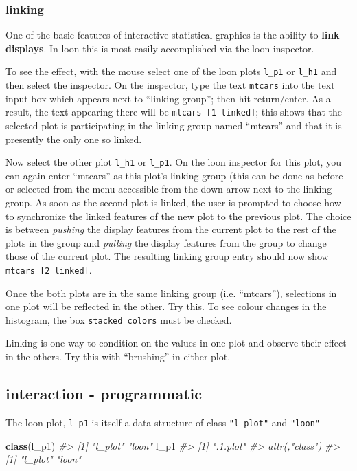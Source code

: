 \documentclass[]{article}
\newenvironment{Shaded}{\begin{snugshade}}{\end{snugshade}}
\newcommand{\KeywordTok}[1]{\textcolor[rgb]{0.13,0.29,0.53}{\textbf{#1}}}
\newcommand{\CommentTok}[1]{\textcolor[rgb]{0.56,0.35,0.01}{\textit{#1}}}
\newcommand{\NormalTok}[1]{#1}
\begin{document}
\subsubsection{linking}\label{linking}

One of the basic features of interactive statistical graphics is the
ability to \textbf{link displays}. In loon this is most easily
accomplished via the loon inspector.

To see the effect, with the mouse select one of the loon plots
\texttt{l\_p1} or \texttt{l\_h1} and then select the inspector. On the
inspector, type the text \texttt{mtcars} into the text input box which
appears next to ``linking group''; then hit return/enter. As a result,
the text appearing there will be \texttt{mtcars\ {[}1\ linked{]}}; this
shows that the selected plot is participating in the linking group named
``mtcars'' and that it is presently the only one so linked.

Now select the other plot \texttt{l\_h1} or \texttt{l\_p1}. On the loon
inspector for this plot, you can again enter ``mtcars'' as this plot's
linking group (this can be done as before or selected from the menu
accessible from the down arrow next to the linking group. As soon as the
second plot is linked, the user is prompted to choose how to synchronize
the linked features of the new plot to the previous plot. The choice is
between \emph{pushing} the display features from the current plot to the
rest of the plots in the group and \emph{pulling} the display features
from the group to change those of the current plot. The resulting
linking group entry should now show \texttt{mtcars\ {[}2\ linked{]}}.

Once the both plots are in the same linking group (i.e. ``mtcars''),
selections in one plot will be reflected in the other. Try this. To see
colour changes in the histogram, the box \texttt{stacked\ colors} must
be checked.

Linking is one way to condition on the values in one plot and observe
their effect in the others. Try this with ``brushing'' in either plot.

\subsection{interaction -
programmatic}\label{interaction---programmatic}

The loon plot, \texttt{l\_p1} is itself a data structure of class
\texttt{"l\_plot"} and \texttt{"loon"}

\begin{Shaded}
\begin{Highlighting}[]
\KeywordTok{class}\NormalTok{(l_p1)}
\CommentTok{#> [1] "l_plot" "loon"}
\NormalTok{l_p1}
\CommentTok{#> [1] ".1.plot"}
\CommentTok{#> attr(,"class")}
\CommentTok{#> [1] "l_plot" "loon"}
\end{Highlighting}
\end{Shaded}
\end{document}
